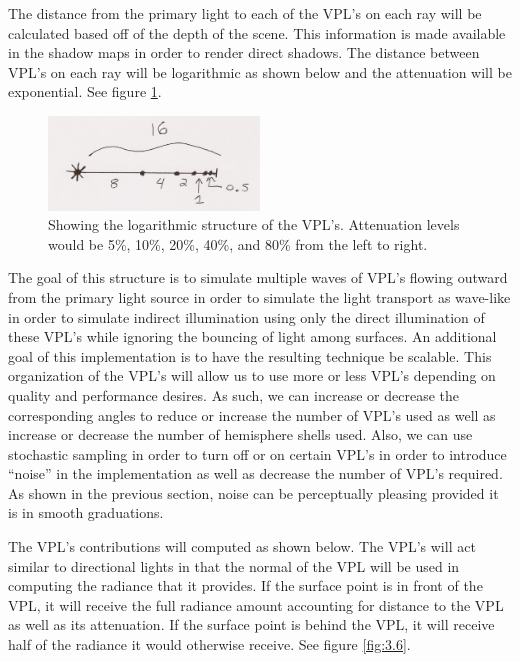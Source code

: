 The distance from the primary light to each of the VPL's on each ray will be calculated based off of the depth of the scene.  This information is made available in the shadow maps in order to render direct shadows.  The distance between VPL's on each ray will be logarithmic as shown below and the attenuation will be exponential.  See figure \ref{fig:3.5}.

\begin{figure}[h!]
  \centering
    \includegraphics[width=0.5\textwidth]{Figure35.jpg}
  \caption{Showing the logarithmic structure of the VPL's.  Attenuation levels would be 5\%, 10\%, 20\%, 40\%, and 80\% from the left to right.}
	\label{fig:3.5}
\end{figure}

The goal of this structure is to simulate multiple waves of VPL's flowing outward from the primary light source in order to simulate the light transport as wave-like in order to simulate indirect illumination using only the direct illumination of these VPL's while ignoring the bouncing of light among surfaces.  An additional goal of this implementation is to have the resulting technique be scalable.  This organization of the VPL's will allow us to use more or less VPL's depending on quality and performance desires.  As such, we can increase or decrease the corresponding angles to reduce or increase the number of VPL's used as well as increase or decrease the number of hemisphere shells used.  Also, we can use stochastic sampling in order to turn off or on certain VPL's in order to introduce “noise” in the implementation as well as decrease the number of VPL's required.  As shown in the previous section, noise can be perceptually pleasing provided it is in smooth graduations.

The VPL's contributions will computed as shown below.  The VPL's will act similar to directional lights in that the normal of the VPL will be used in computing the radiance that it provides.  If the surface point is in front of the VPL, it will receive the full radiance amount accounting for distance to the VPL as well as its attenuation.  If the surface point is behind the VPL, it will receive half of the radiance it would otherwise receive.  See figure \ref{fig:3.6}.

